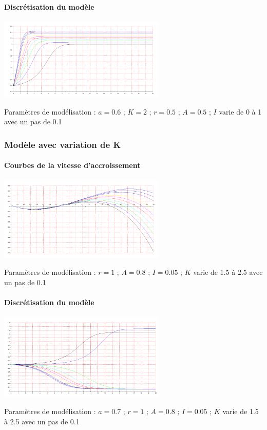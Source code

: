 \documentclass{article}
\begin{document}
\newpage

\paragraph{Discrétisation du modèle}
\begin{center}
\includegraphics[width=300px]{img/part1/TrajI.png}
\end{center}
Paramètres de modélisation : $a=0.6$ ; $K=2$  ; $r=0.5$ ; $A=0.5$ ; $I$ varie de 0 à 1 avec un pas de 0.1
\paragraph{}

\subsubsection{Modèle avec variation de K}

\paragraph{Courbes de la vitesse d'accroissement}
\begin{center}
\includegraphics[width=300px]{img/part1/AlleeK.png}
\end{center}
Paramètres de modélisation : $r=1$ ; $A=0.8$ ; $I=0.05$ ; $K$ varie de 1.5 à 2.5 avec un pas de 0.1
\paragraph{}

\paragraph{Discrétisation du modèle}
\begin{center}
\includegraphics[width=300px]{img/part1/TrajK.png}
\end{center}
Paramètres de modélisation : $a=0.7$ ; $r=1$ ; $A=0.8$ ; $I=0.05$ ; $K$ varie de 1.5 à 2.5 avec un pas de 0.1
\end{document}
